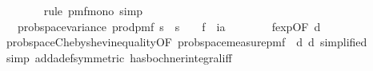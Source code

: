 \begin{isabellebody}
\ \ \ \ \ \ \isamarkupfalse%
\ {\isacharparenleft}{\kern0pt}rule\ pmf{\isacharunderscore}{\kern0pt}mono{\isacharunderscore}{\kern0pt}{}{\isacharcomma}{\kern0pt}\ simp{\isacharparenright}{\kern0pt}\isanewline
\ \ \ \ \isamarkupfalse%
\ \isamarkupfalse%
\ {\isachardoublequoteopen}{\isachardot}{\kern0pt}{\isachardot}{\kern0pt}{\isachardot}{\kern0pt}\ {\isasymle}\ prob{\isacharunderscore}{\kern0pt}space{\isachardot}{\kern0pt}variance\ {\isacharparenleft}{\kern0pt}prod{\isacharunderscore}{\kern0pt}pmf\ {\isacharparenleft}{\kern0pt}{\isacharbraceleft}{\kern0pt}{}{\isachardot}{\kern0pt}{\isachardot}{\kern0pt}{\isacharless}{\kern0pt}s\ {\isasymtimes}\ {\isacharbraceleft}{\kern0pt}{}{\isachardot}{\kern0pt}{\isachardot}{\kern0pt}{\isacharless}{\kern0pt}s\ {\isacharparenleft}{\kern0pt}{\isasymlambda}{\isacharunderscore}{\kern0pt}{\isachardot}{\kern0pt}\ {\isasymOmega}{\isacharparenright}{\kern0pt}{\isacharparenright}{\kern0pt}\ {\isacharparenleft}{\kern0pt}{\isasymlambda}{\isasymomega}{\isachardot}{\kern0pt}\ f{}\ {\isasymomega}\ i{\isacharparenright}{\kern0pt}{\isacharslash}{\kern0pt}a{\isacharcircum}{\kern0pt}{}{\isachardoublequoteclose}\isanewline
\ \ \ \ \ \ \isamarkupfalse%
\ f{}{\isacharunderscore}{\kern0pt}exp{\isacharbrackleft}{\kern0pt}OF\ d{\isacharunderscore}{\kern0pt}{}{\isacharbrackright}{\kern0pt}\isanewline
\ \ \ \ \ \ \isamarkupfalse%
\ prob{\isacharunderscore}{\kern0pt}space{\isachardot}{\kern0pt}Chebyshev{\isacharunderscore}{\kern0pt}inequality{\isacharbrackleft}{\kern0pt}OF\ prob{\isacharunderscore}{\kern0pt}space{\isacharunderscore}{\kern0pt}measure{\isacharunderscore}{\kern0pt}pmf\ {\isacharunderscore}{\kern0pt}\ d{\isacharunderscore}{\kern0pt}{}\ d{\isacharunderscore}{\kern0pt}{}{\isacharcomma}{\kern0pt}\ simplified{\isacharbrackright}{\kern0pt}\isanewline
\ \ \ \ \ \ \isamarkupfalse%
\ {\isacharparenleft}{\kern0pt}simp\ add{\isacharcolon}{\kern0pt}a{\isacharunderscore}{\kern0pt}def{\isacharbrackleft}{\kern0pt}symmetric{\isacharbrackright}{\kern0pt}\ has{\isacharunderscore}{\kern0pt}bochner{\isacharunderscore}{\kern0pt}integral{\isacharunderscore}{\kern0pt}iff{\isacharparenright}{\kern0pt}\isanewline
\ \ \ \ \isamarkupfalse%
\ \isamarkupfalse%
\ {\isachardoublequoteopen}{\isachardot}{\kern0pt}{\isachardot}{\kern0pt}{\isachardot}{\kern0pt}\ {\isasymle}\ {}{\isacharslash}{\kern0pt}{}{\isachardoublequoteclose}\ \isamarkupfalse%

\end{isabellebody}
